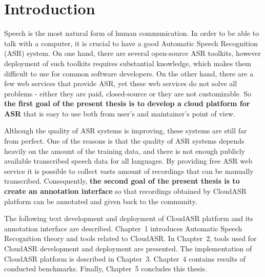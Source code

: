 \chapter*{Introduction}

Speech is the most natural form of human communication.
In order to be able to talk with a computer,
  it is crucial to have a good Automatic Speech Recognition (ASR) system.
On one hand, there are several open-source ASR toolkits,
  however deployment of such toolkits requires substantial knowledge,
  which makes them difficult to use for common software developers.
On the other hand, there are a few web services that provide ASR,
  yet these web services do not solve all problems -
  either they are paid, closed-source or they are not customizable.
So \textbf{the first goal of the present thesis is to develop a cloud platform for ASR}
  that is easy to use both from user's and maintainer's point of view.

Although the quality of ASR systems is improving,
  these systems are still far from perfect.
One of the reasons is that the quality of ASR systems depends heavily on the amount of the training data,
  and there is not enough publicly available transcribed speech data for all languages.
By providing free ASR web service it is possible to collect vasts amount of recordings
  that can be manually transcribed.
Consequently, \textbf{the second goal of the present thesis is to create an annotation interface}
  so that recordings obtained by CloudASR platform can be annotated and given back to the community.

The following text development and deployment of CloudASR platform and its annotation interface are described.
Chapter~1 introduces Automatic Speech Recognition theory and tools related to CloudASR.
In Chapter~2, tools used for CloudASR development and deployment are presented.
The implementation of CloudASR platform is described in Chapter~3.
Chapter~4 contains results of conducted benchmarks.
Finally, Chapter~5 concludes this thesis.
